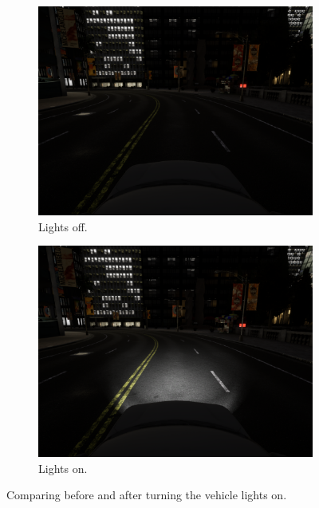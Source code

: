 \begin{figure}
    \centering
    \begin{subfigure}[h!]{0.49\textwidth}
        \centering
        \includegraphics[width=\textwidth]{chapters/3-method/figures/lights-off.png}
        \caption{Lights off.}
        \label{fig:lights-off}
    \end{subfigure}
    \hfill
    \begin{subfigure}[h!]{0.49\textwidth}
        \centering
        \includegraphics[width=\textwidth]{chapters/3-method/figures/lights-on.png}
        \caption{Lights on.}
        \label{fig:lights-on}
    \end{subfigure}
    \caption{Comparing before and after turning the vehicle lights on.}
    \label{fig:comparing-lights-on-off}
\end{figure}

